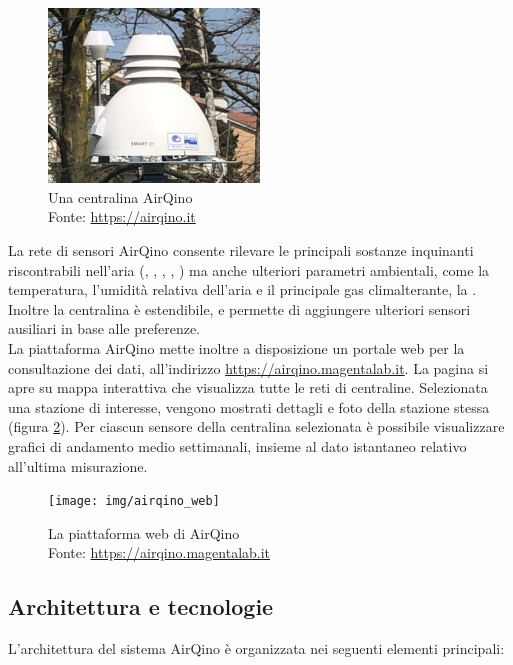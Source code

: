 \begin{figure}[H]
\centering
\captionsetup{justification=centering}
\includegraphics[width=0.50\textwidth,height=\textheight,keepaspectratio]{img/airqino_stazione}
\caption{Una centralina AirQino\\Fonte: \url{https://airqino.it}}
\label{fig:airqino_stazione}
\end{figure}

La rete di sensori AirQino consente rilevare le principali sostanze inquinanti riscontrabili nell’aria (, , , , ) ma anche ulteriori parametri ambientali, come la temperatura, l'umidità relativa dell’aria e il principale gas climalterante, la .
Inoltre la centralina è estendibile, e permette di aggiungere ulteriori sensori ausiliari in base alle preferenze.\\

La piattaforma AirQino mette inoltre a disposizione un portale web per la consultazione dei dati, all'indirizzo \url{https://airqino.magentalab.it}. La pagina si apre su mappa interattiva che visualizza tutte le reti di centraline. Selezionata una stazione di interesse, vengono mostrati dettagli e foto della stazione stessa (figura \ref{fig:airqino_web}). Per ciascun sensore della centralina selezionata è possibile visualizzare grafici di andamento medio settimanali, insieme al dato istantaneo relativo all'ultima misurazione. \cite{airqino}

\begin{figure}[H]
\centering
\captionsetup{justification=centering}
\texttt{[image: img/airqino\_web]}
\caption{La piattaforma web di AirQino\\Fonte: \url{https://airqino.magentalab.it}}
\label{fig:airqino_web}
\end{figure}

\subsection{Architettura e tecnologie}\label{ssec:airqino-architettura}
L'architettura del sistema AirQino è organizzata nei seguenti elementi principali:

